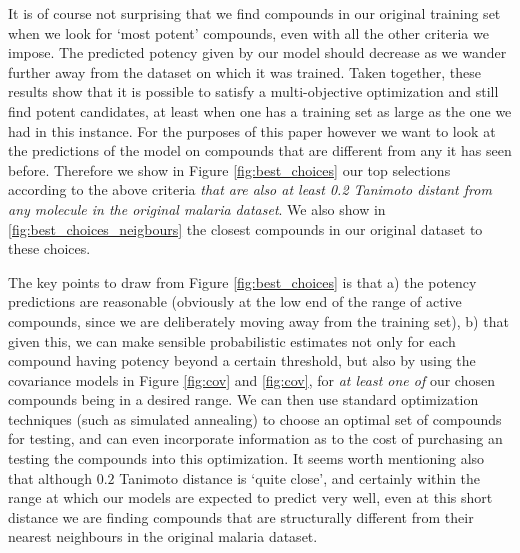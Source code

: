 \documentclass{article}
\begin{document}
It is of course not surprising that we find compounds in our original training set when we look for `most potent' compounds, even with all the other criteria we impose.  The predicted potency given by our model should decrease as we wander further away from the dataset on which it was trained.  Taken together,  these results show that it is possible to satisfy a multi-objective optimization and still find  potent candidates, at least when one has a training set as large as the one we had in this instance.
\newline
\newline
For the purposes of this paper however we want to look at the predictions of the model on compounds that are different from any it has seen before.  Therefore we show in Figure \ref{fig:best_choices} our top selections according to the above criteria \textit{that are also at least 0.2 Tanimoto distant from any molecule in the original malaria dataset}.  We also show in \ref{fig:best_choices_neigbours} the closest compounds in our original dataset to these choices.



The key points to draw from Figure \ref{fig:best_choices} is that a) the potency predictions are reasonable (obviously at the low end of the range of active compounds, since we are deliberately moving away from the training set), b) that given this, we can make sensible probabilistic estimates not only for each compound having potency beyond a certain threshold, but also by using the covariance models in Figure \ref{fig:cov} and \ref{fig:cov}, for \textit{at least one of} our chosen compounds being in a desired range.   We can then use standard optimization techniques (such as simulated annealing) to choose an optimal set of compounds for testing, and can even incorporate information as to the cost of purchasing an testing the compounds into this optimization.  It seems worth mentioning also that although $0.2$ Tanimoto distance is `quite close', and certainly within the range at which our models are expected to predict very well, even at this short distance we are finding compounds that are structurally different from their nearest neighbours in the original malaria dataset.  


\end{document}

